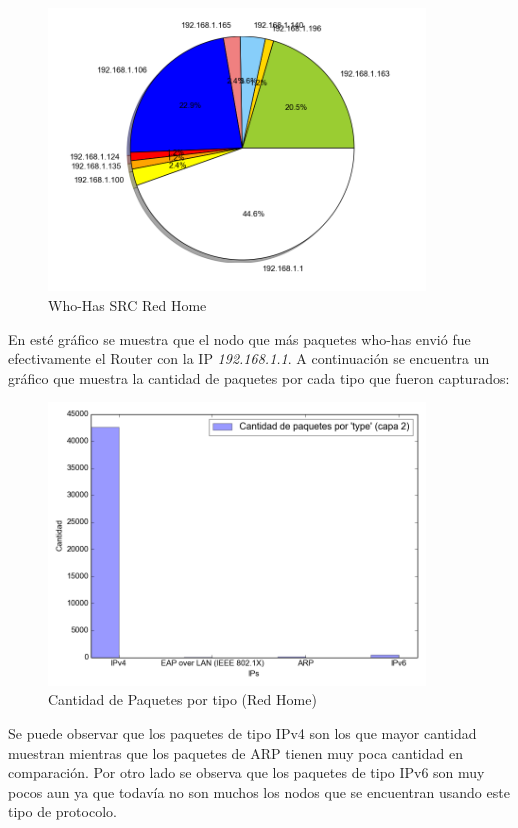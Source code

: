 \FloatBarrier
\begin{center}
	\begin{figure}[ht]
    	\centering
		\includegraphics[width=10cm]{imgs/outputNicoLassoCasa_p-arp_who_src-torta.png}
		\caption{Who-Has SRC Red Home}
	\end{figure}
\end{center}
\FloatBarrier

\indent En esté gráfico se muestra que el nodo que más paquetes who-has envió fue efectivamente el Router con la IP \textit{192.168.1.1}. A continuación se encuentra un gráfico que muestra la cantidad de paquetes por cada tipo que fueron capturados:

\FloatBarrier
\begin{center}
	\begin{figure}[ht]
    	\centering
		\includegraphics[width=10cm]{imgs/outputNicoLassoCasa_p-pkgs_by_type.png}
		\caption{Cantidad de Paquetes por tipo (Red Home)}
	\end{figure}
\end{center}
\FloatBarrier

\indent Se puede observar que los paquetes de tipo IPv4 son los que mayor cantidad muestran mientras que los paquetes de ARP tienen muy poca cantidad en comparación. Por otro lado se observa que los paquetes de tipo IPv6 son muy pocos aun ya que todavía no son muchos los nodos que se encuentran usando este tipo de protocolo.

